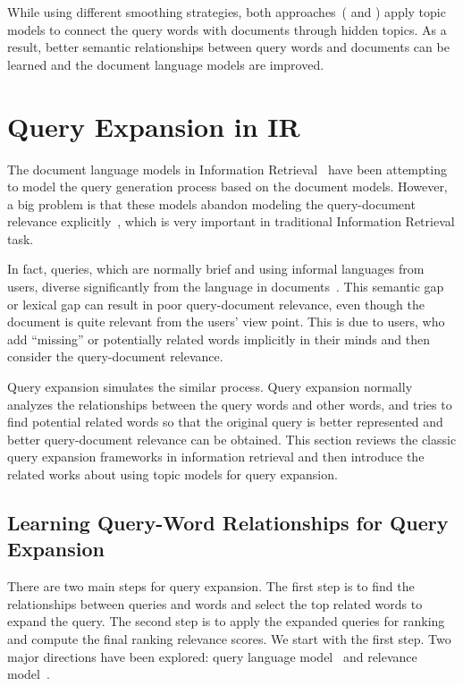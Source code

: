 
While using different smoothing strategies, both approaches~(\citep{wei-06} and \citep{Lu-2011}) apply topic models to connect the query words with documents through hidden topics. As a result, better semantic relationships between query words and documents can be learned and the document language models are improved.

\section{Query Expansion in IR}

The document language models in Information Retrieval~\citep{PonteCroft} have been attempting to model the query generation process based on the document models. However, a big problem is that these models abandon modeling the query-document relevance explicitly~\citep{Lavrenko-2001}, which is very important in traditional Information Retrieval task.

In fact, queries, which are normally brief and using informal languages from users, diverse significantly from the language in documents~\citep{Muller-2009}. This semantic gap or lexical gap can result in poor query-document relevance, even though the document is quite relevant from the users' view point. This is due to users, who add ``missing'' or potentially related words implicitly in their minds and then consider the query-document relevance.

Query expansion simulates the similar process. Query expansion normally analyzes the relationships between the query words and other words, and tries to find potential related words so that the original query is better represented and better query-document relevance can be obtained. This section reviews the classic query expansion frameworks in information retrieval and then introduce the related works about using topic models for query expansion.

\subsection{Learning Query-Word Relationships for Query Expansion}

There are two main steps for query expansion. The first step is to find the relationships between queries and words and select the top related words to expand the query. The second step is to apply the expanded queries for ranking and compute the final ranking relevance scores. We start with the first step. Two major directions have been explored: query language model~\citep{zhai-01b} and relevance model~\citep{Lavrenko-2001}.

